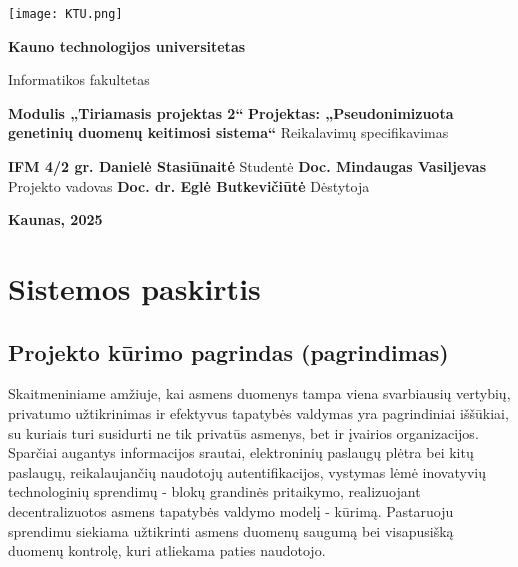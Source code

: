\documentclass[12pt]{article}
\begin{document}

\begin{titlepage}
\vskip 20pt
\begin{center}
\texttt{[image: KTU.png]}
\end{center}


\vskip 20pt
\centerline{\bf \large \textbf{Kauno technologijos universitetas}}
\bigskip
\centerline{\large {Informatikos fakultetas}}
\bigskip

\vskip 90pt
\begin{center}
    {\bf \LARGE Modulis „Tiriamasis projektas 2“}
    \vskip 10pt
    {\bf \Large Projektas: „Pseudonimizuota genetinių duomenų keitimosi sistema“}
    \vskip 15pt
    {\large Reikalavimų specifikavimas}
\end{center}

\vskip 40pt

\hskip 200pt {\bf \large IFM 4/2 gr. Danielė Stasiūnaitė}
\vskip 1pt
\hskip 200pt {\large Studentė}
\vskip 7pt
\hskip 200pt {\bf \large Doc. Mindaugas Vasiljevas}
\vskip 1pt
\hskip 200pt {\large Projekto vadovas}
\vskip 7pt
\hskip 200pt {\bf \large Doc. dr. Eglė Butkevičiūtė}
\vskip 1pt
\hskip 200pt {\large Dėstytoja}

\bigskip

\vskip 100pt
\centerline{\large \textbf{Kaunas, 2025}}
\newpage
\end{titlepage}



\tableofcontents
\newpage

\section{Sistemos paskirtis}
\subsection{Projekto kūrimo pagrindas (pagrindimas)}
Skaitmeniniame amžiuje, kai asmens duomenys tampa viena svarbiausių vertybių,
privatumo užtikrinimas ir efektyvus tapatybės valdymas yra pagrindiniai
iššūkiai, su kuriais turi susidurti ne tik privatūs asmenys, bet ir įvairios
organizacijos. Sparčiai augantys informacijos srautai, elektroninių paslaugų
plėtra bei kitų paslaugų, reikalaujančių naudotojų autentifikacijos, vystymas
lėmė inovatyvių technologinių sprendimų - blokų grandinės pritaikymo, 
realizuojant decentralizuotos asmens tapatybės valdymo modelį - kūrimą.
Pastaruoju sprendimu siekiama užtikrinti asmens duomenų saugumą bei visapusišką
duomenų kontrolę, kuri atliekama paties naudotojo.
\end{document}
